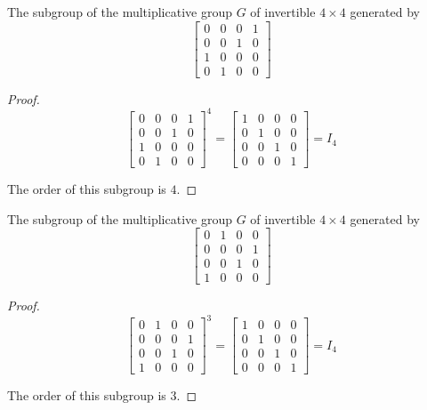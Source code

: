 \begin{exercise}
    The subgroup of the multiplicative group $G$ of invertible $4\times 4$ generated by
    \[
        \begin{bmatrix}
            0 & 0 & 0 & 1 \\
            0 & 0 & 1 & 0 \\
            1 & 0 & 0 & 0 \\
            0 & 1 & 0 & 0
        \end{bmatrix}
    \]
\end{exercise}

\begin{proof}
    \[
        {\begin{bmatrix}
                    0 & 0 & 0 & 1 \\
                    0 & 0 & 1 & 0 \\
                    1 & 0 & 0 & 0 \\
                    0 & 1 & 0 & 0
                \end{bmatrix}}^{4} =
        \begin{bmatrix}
            1 & 0 & 0 & 0 \\
            0 & 1 & 0 & 0 \\
            0 & 0 & 1 & 0 \\
            0 & 0 & 0 & 1
        \end{bmatrix} = I_{4}
    \]

    The order of this subgroup is $4$.
\end{proof}

\begin{exercise}
    The subgroup of the multiplicative group $G$ of invertible $4\times 4$ generated by
    \[
        \begin{bmatrix}
            0 & 1 & 0 & 0 \\
            0 & 0 & 0 & 1 \\
            0 & 0 & 1 & 0 \\
            1 & 0 & 0 & 0
        \end{bmatrix}
    \]
\end{exercise}

\begin{proof}
    \[
        {\begin{bmatrix}
                    0 & 1 & 0 & 0 \\
                    0 & 0 & 0 & 1 \\
                    0 & 0 & 1 & 0 \\
                    1 & 0 & 0 & 0
                \end{bmatrix}}^{3} =
        \begin{bmatrix}
            1 & 0 & 0 & 0 \\
            0 & 1 & 0 & 0 \\
            0 & 0 & 1 & 0 \\
            0 & 0 & 0 & 1
        \end{bmatrix} = I_{4}
    \]

    The order of this subgroup is $3$.
\end{proof}

